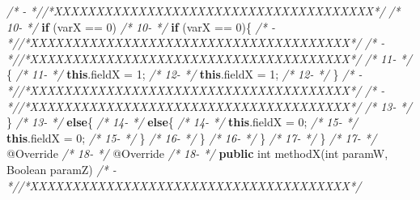 \documentclass[
]{article}
\newenvironment{Shaded}{\begin{snugshade}}{\end{snugshade}}
\newcommand{\AttributeTok}[1]{\textcolor[rgb]{0.77,0.63,0.00}{#1}}
\newcommand{\BuiltInTok}[1]{#1}
\newcommand{\CommentTok}[1]{\textcolor[rgb]{0.56,0.35,0.01}{\textit{#1}}}
\newcommand{\DataTypeTok}[1]{\textcolor[rgb]{0.13,0.29,0.53}{#1}}
\newcommand{\DecValTok}[1]{\textcolor[rgb]{0.00,0.00,0.81}{#1}}
\newcommand{\FunctionTok}[1]{\textcolor[rgb]{0.00,0.00,0.00}{#1}}
\newcommand{\KeywordTok}[1]{\textcolor[rgb]{0.13,0.29,0.53}{\textbf{#1}}}
\newcommand{\NormalTok}[1]{#1}
\begin{document}
\begin{landscape}
\begin{Shaded}
\begin{Highlighting}[]
\CommentTok{/*   -   *//*XXXXXXXXXXXXXXXXXXXXXXXXXXXXXXXXXXXXXX*/}               \CommentTok{/* 10-   */}        \KeywordTok{if}\NormalTok{ (varX == }\DecValTok{0}\NormalTok{)                                   }
\CommentTok{/* 10-   */}        \KeywordTok{if}\NormalTok{ (varX == }\DecValTok{0}\NormalTok{)\{                                  }\CommentTok{/*   -   *//*XXXXXXXXXXXXXXXXXXXXXXXXXXXXXXXXXXXXXX*/}               
\CommentTok{/*   -   *//*XXXXXXXXXXXXXXXXXXXXXXXXXXXXXXXXXXXXXX*/}               \CommentTok{/* 11-   */}\NormalTok{        \{                                                }
\CommentTok{/* 11-   */}            \KeywordTok{this}\NormalTok{.}\FunctionTok{fieldX}\NormalTok{ = }\DecValTok{1}\NormalTok{;                             }\CommentTok{/* 12-   */}            \KeywordTok{this}\NormalTok{.}\FunctionTok{fieldX}\NormalTok{ = }\DecValTok{1}\NormalTok{;                             }
\CommentTok{/* 12-   */}\NormalTok{        \}                                                }\CommentTok{/*   -   *//*XXXXXXXXXXXXXXXXXXXXXXXXXXXXXXXXXXXXXX*/}               
\CommentTok{/*   -   *//*XXXXXXXXXXXXXXXXXXXXXXXXXXXXXXXXXXXXXX*/}               \CommentTok{/* 13-   */}\NormalTok{        \}                                                            }
\CommentTok{/* 13-   */}        \KeywordTok{else}\NormalTok{\{                                            }\CommentTok{/* 14-   */}        \KeywordTok{else}\NormalTok{\{                                            }
\CommentTok{/* 14-   */}            \KeywordTok{this}\NormalTok{.}\FunctionTok{fieldX}\NormalTok{ = }\DecValTok{0}\NormalTok{;                             }\CommentTok{/* 15-   */}            \KeywordTok{this}\NormalTok{.}\FunctionTok{fieldX}\NormalTok{ = }\DecValTok{0}\NormalTok{;                             }
\CommentTok{/* 15-   */}\NormalTok{        \}                                                }\CommentTok{/* 16-   */}\NormalTok{        \}                                                }
\CommentTok{/* 16-   */}\NormalTok{    \}                                                    }\CommentTok{/* 17-   */}\NormalTok{    \}                                                    }
\CommentTok{/* 17-   */}    \AttributeTok{@Override}                                            \CommentTok{/* 18-   */}    \AttributeTok{@Override}                                            
\CommentTok{/* 18-   */}    \KeywordTok{public} \DataTypeTok{int} \FunctionTok{methodX}\NormalTok{(}\DataTypeTok{int}\NormalTok{ paramW, }\BuiltInTok{Boolean}\NormalTok{ paramZ)       }\CommentTok{/*   -   *//*XXXXXXXXXXXXXXXXXXXXXXXXXXXXXXXXXXXXXX*/}               

\end{Highlighting}
\end{Shaded}
\end{landscape}
\end{document}
